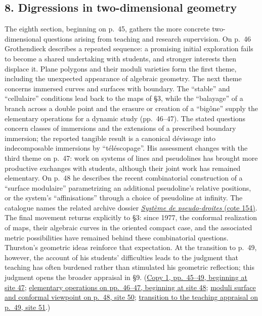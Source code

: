 \documentclass[11pt,a4paper]{article}
\begin{document}
\subsection*{8. Digressions in two-dimensional geometry}
The eighth section, beginning on p.~45, gathers the more concrete
two-dimensional questions arising from teaching and research supervision.
On p.~46 Grothendieck describes a repeated sequence: a promising initial
exploration fails to become a shared undertaking with students, and
stronger interests then displace it. Plane polygons and their moduli
varieties form the first theme, including the unexpected appearance of
algebraic geometry. The next theme concerns immersed curves and surfaces
with boundary. The ``stable'' and ``cellulaire'' conditions lead back to
the maps of \S3, while the ``balayage'' of a branch across a double point
and the erasure or creation of a ``bigône'' supply the elementary
operations for a dynamic study (pp.~46--47). The stated questions concern
classes of immersions and the extensions of a prescribed boundary
immersion; the reported tangible result is a canonical dévissage into
indecomposable immersions by ``téléscopage''. His assessment changes with
the third theme on p.~47: work on systems of lines and pseudolines has
brought more productive exchanges with students, although their joint
work has remained elementary. On p.~48 he describes the recent
combinatorial construction of a ``surface modulaire'' parametrizing an
additional pseudoline's relative positions, or the system's
``affinisations'' through a choice of pseudoline at infinity. The
catalogue names the related archive dossier
\href{https://grothendieck.umontpellier.fr/archives-grothendieck/}{\emph{Système de pseudo-droites} (cote 154)}.
The final movement returns explicitly to \S3: since 1977, the conformal
realization of maps, their algebraic curves in the oriented compact case,
and the associated metric possibilities have remained behind these
combinatorial questions. Thurston's geometric ideas reinforce that
expectation. At the transition to p.~49, however, the account of his
students' difficulties leads to the judgment that teaching has often
burdened rather than stimulated his geometric reflection; this judgment
opens the broader appraisal in \S9.
(\href{https://grothendieck.umontpellier.fr/web/viewer.html?file=../119.pdf\#page=48}{Copy 1, pp.~45--49, beginning at site 47};
\href{https://grothendieck.umontpellier.fr/web/viewer.html?file=../119.pdf\#page=49}{elementary operations on pp.~46--47, beginning at site 48};
\href{https://grothendieck.umontpellier.fr/web/viewer.html?file=../119.pdf\#page=51}{moduli surface and conformal viewpoint on p.~48, site 50};
\href{https://grothendieck.umontpellier.fr/web/viewer.html?file=../119.pdf\#page=52}{transition to the teaching appraisal on p.~49, site 51}.)
\end{document}
